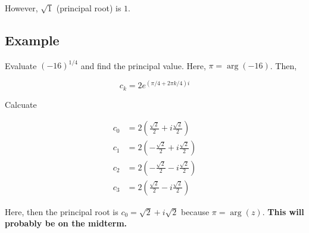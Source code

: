 \documentclass{article}
\newtheorem{one minute paper}[theorem]{One Minute Paper}
\begin{document}
However, $\sqrt{1}$ (principal root) is $1$. 

\subsection*{Example}

Evaluate $(-16)^{1/4}$ and find the principal value. Here, $\pi = \arg(-16)$. Then, 

\begin{equation}
    c_k = 2e^{(\pi/4 + 2\pi k/4 )i}
\end{equation}

Calcuate 

\begin{align}
    c_0 &= 2\left( \frac{\sqrt{2}}{2} + i\frac{\sqrt{2}}{2} \right) \\
    c_1 &= 2\left( -\frac{\sqrt{2}}{2} + i\frac{\sqrt{2}}{2} \right) \\
    c_2 &= 2\left( -\frac{\sqrt{2}}{2} - i\frac{\sqrt{2}}{2} \right) \\
    c_3 &= 2\left( \frac{\sqrt{2}}{2} - i\frac{\sqrt{2}}{2} \right)
\end{align}

Here, then the principal root is $c_0 = \sqrt{2} + i\sqrt{2}$ because $\pi = \arg(z)$. \textbf{This will probably be on the midterm.}
\end{document}
